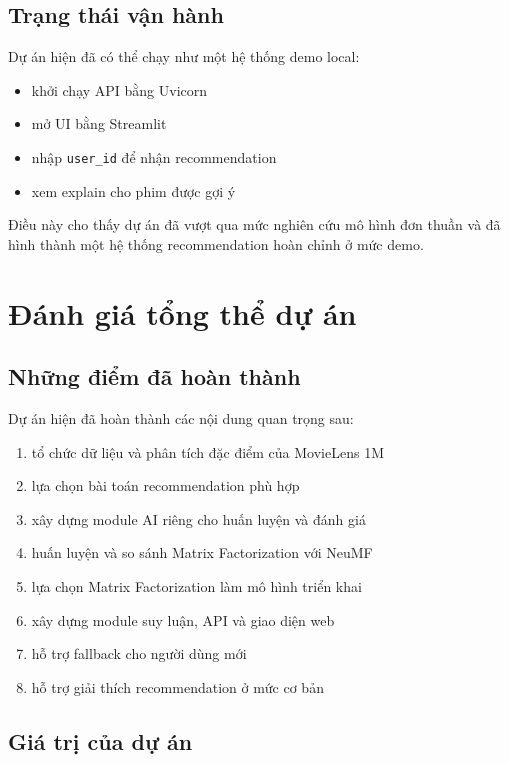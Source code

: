\documentclass[12pt,a4paper]{article}
\begin{document}
\subsection{Trạng thái vận hành}

Dự án hiện đã có thể chạy như một hệ thống demo local:

\begin{itemize}[leftmargin=1.5cm]
    \item khởi chạy API bằng Uvicorn
    \item mở UI bằng Streamlit
    \item nhập \texttt{user\_id} để nhận recommendation
    \item xem explain cho phim được gợi ý
\end{itemize}

Điều này cho thấy dự án đã vượt qua mức nghiên cứu mô hình đơn thuần và đã hình thành một hệ thống recommendation hoàn chỉnh ở mức demo.

\section{Đánh giá tổng thể dự án}

\subsection{Những điểm đã hoàn thành}

Dự án hiện đã hoàn thành các nội dung quan trọng sau:

\begin{enumerate}[leftmargin=1.5cm]
    \item tổ chức dữ liệu và phân tích đặc điểm của MovieLens 1M
    \item lựa chọn bài toán recommendation phù hợp
    \item xây dựng module AI riêng cho huấn luyện và đánh giá
    \item huấn luyện và so sánh Matrix Factorization với NeuMF
    \item lựa chọn Matrix Factorization làm mô hình triển khai
    \item xây dựng module suy luận, API và giao diện web
    \item hỗ trợ fallback cho người dùng mới
    \item hỗ trợ giải thích recommendation ở mức cơ bản
\end{enumerate}

\subsection{Giá trị của dự án}
\end{document}
